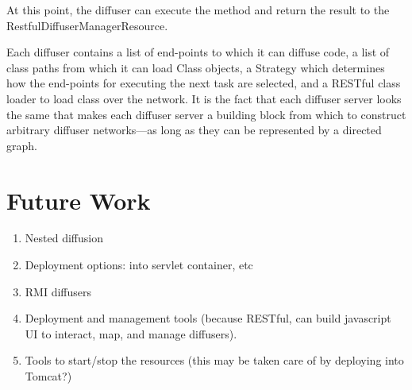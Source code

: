 \documentclass[11pt]{article}
\begin{document}
At this point, the diffuser can execute the method and return the result to the \textsf{Restful\-Diffuser\-Manager\-Resource}.

Each diffuser contains a list of end-points to which it can diffuse code, a list of class paths from which it can load \textsf{Class} objects, a \textsf{Strategy} which determines how the end-points for executing the next task are selected, and a RESTful class loader to load class over the network. It is the fact that each diffuser server looks the same that makes each diffuser server a building block from which to construct arbitrary diffuser networks---as long as they can be represented by a directed graph.

%
%
\section{Future Work\label{sec:future_work}}
\begin{enumerate}
\item Nested diffusion
\item Deployment options: into servlet container, etc
\item RMI diffusers
\item Deployment and management tools (because RESTful, can build javascript UI to interact, map, and manage diffusers).
\item Tools to start/stop the resources (this may be taken care of by deploying into Tomcat?)
\end{enumerate}
\end{document}
